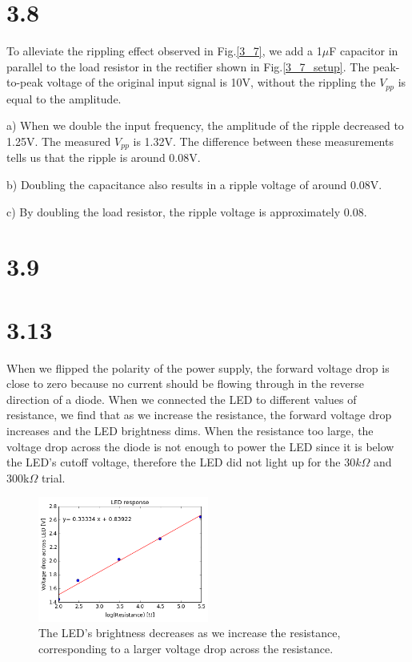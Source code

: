 \documentclass[authoryear, 12pt,5p, times]{elsarticle}
\begin{document}
\section*{3.8}
To alleviate the rippling effect observed in Fig.\ref{3_7}, we add a 1$\mu$F capacitor in parallel to the load resistor in the rectifier shown in Fig.\ref{3_7_setup}. The peak-to-peak voltage of the original input signal  is 10V, without the rippling the $V_{pp}$ is equal to the amplitude.
\par a) When we double the input frequency, the amplitude of the ripple  decreased to 1.25V. The measured $V_{pp}$ is 1.32V. The difference between these measurements tells us that the ripple is around 0.08V.  
\par  b) Doubling the capacitance also results in a ripple voltage of around 0.08V.
\par c) By doubling the load resistor, the ripple  voltage is approximately 0.08.
\section*{3.9}
\section*{3.13}
When we flipped the polarity of the power supply, the forward voltage drop is close to zero because no current should be flowing through in the reverse direction of a diode. When we connected the LED to different values of resistance, we find that as we increase the resistance, the forward voltage drop increases and the LED brightness dims. When the resistance too large, the voltage drop across the diode is not enough to power the LED since it is below the LED's cutoff voltage, therefore the LED did not light up for the $30k\Omega$ and 300k$\Omega$ trial.
\begin{figure}[h!]
\center
\includegraphics[width=0.5\textwidth]{figure/3_13_LED}
\caption{The LED's brightness decreases as we increase the resistance, corresponding to a larger voltage drop across the resistance.}
\label{3_13_LED}
\end{figure}
\end{document}
